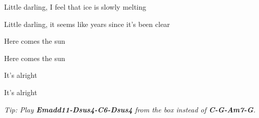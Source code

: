 \begin{song}
\bigskip

 Little darling, I feel that ice is slowly melting \par
{} Little darling, it seems like years since it's been clear \par

\bigskip

\Chorus

\bigskip

\begin{strumbox}
\large
{}
\end{strumbox}

 Here comes the sun  \par
{} Here comes the sun \par
{} It's alright   \par
{} It's alright   \par

   

\vfill

{
\smaller\it Tip: Play \textbf{Emadd11-Dsus4-C6-Dsus4} from the box instead of \textbf{C-G-Am7-G}.
}

\medskip


\end{song}
